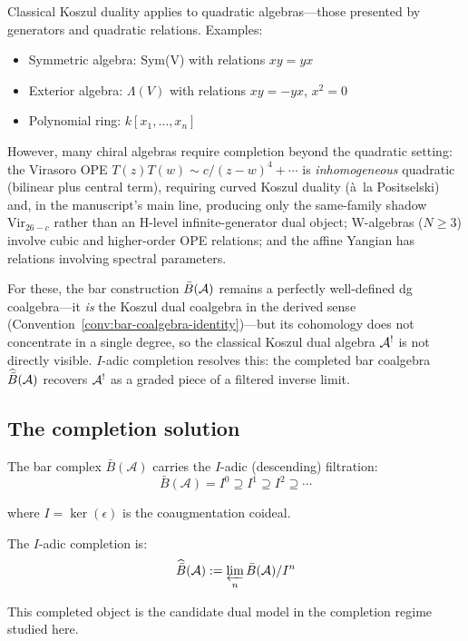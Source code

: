 \begin{observation}\label{obs:quadratic-limitation}
Classical Koszul duality applies to quadratic algebras—those presented by generators and quadratic relations. Examples:
\begin{itemize}
\item Symmetric algebra: Sym(V) with relations $xy = yx$
\item Exterior algebra: $\Lambda(V)$ with relations $xy = -yx$, $x^2 = 0$
\item Polynomial ring: $k[x_1, \ldots, x_n]$
\end{itemize}

However, many chiral algebras require completion beyond the quadratic
setting: the Virasoro OPE $T(z)T(w) \sim c/(z-w)^4 + \cdots$ is
\emph{inhomogeneous} quadratic (bilinear plus central term), requiring
curved Koszul duality (\`{a}~la Positselski) and, in the manuscript's
main line, producing only the same-family shadow
$\mathrm{Vir}_{26-c}$ rather than an H-level infinite-generator dual
object; W-algebras ($N \geq 3$) involve cubic and higher-order OPE
relations; and the affine Yangian has relations involving spectral
parameters.

For these, the bar construction $\bar{B}(\mathcal{A})$ remains a perfectly well-defined dg coalgebra---it \emph{is} the Koszul dual coalgebra in the derived sense (Convention~\ref{conv:bar-coalgebra-identity})---but its cohomology does not concentrate in a single degree, so the classical Koszul dual algebra $\mathcal{A}^!$ is not directly visible.  $I$-adic completion resolves this: the completed bar coalgebra $\widehat{\bar{B}}(\mathcal{A})$ recovers $\mathcal{A}^!$ as a graded piece of a filtered inverse limit.
\end{observation}

\subsection{The completion solution}

\begin{idea}\label{idea:I-adic}
The bar complex $\bar{B}(\mathcal{A})$ carries the $I$-adic (descending) filtration:
\[\bar{B}(\mathcal{A}) = I^0 \supseteq I^1 \supseteq I^2 \supseteq \cdots\]

where $I = \ker(\epsilon)$ is the coaugmentation coideal.

The $I$-adic completion is:
\[\widehat{\bar{B}}(\mathcal{A}) := \varprojlim_n \bar{B}(\mathcal{A})/I^n\]

This completed object is the candidate dual model in the completion
regime studied here.
\end{idea}

